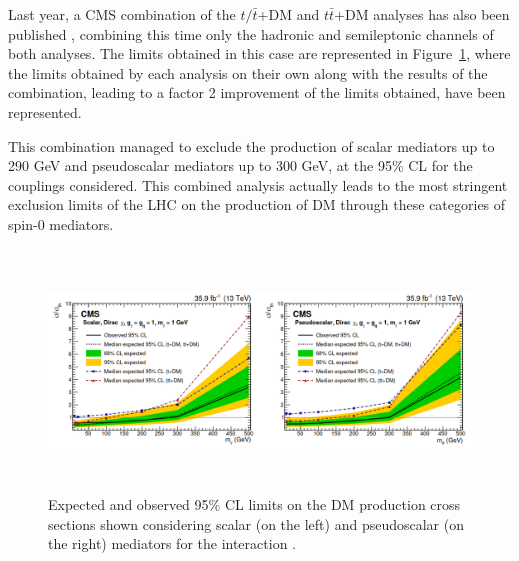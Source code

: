 \documentclass[a4paper, 10pt, openright]{report}
\begin{document}
Last year, a \ac{CMS} combination of the $t/\bar t$+DM and $t \bar t$+DM analyses has also been published \cite{PreviousSingleDoubleTopAllLep13CMS}, combining this time only the hadronic and semileptonic channels of both analyses. The limits obtained in this case are represented in Figure~\ref{figure:Combination2019}, where the limits obtained by each analysis on their own along with the results of the combination, leading to a factor 2 improvement of the limits obtained, have been represented. 

This combination managed to exclude the production of scalar mediators up to 290 GeV and pseudoscalar mediators up to 300 GeV, at the 95\% \ac{CL} for the couplings considered. This combined analysis actually leads to the most stringent exclusion limits of the \ac{LHC} on the production of \ac{DM} through these categories of spin-0 mediators.

\begin{figure}[htbp]
\begin{center}
\includegraphics[width=15.5cm, height=6.4cm]{figs/Combination2019.png}
\caption{Expected and observed 95\% \ac{CL} limits on the \ac{DM} production cross sections shown considering scalar (on the left) and pseudoscalar (on the right) mediators for the interaction \cite{PreviousSingleDoubleTopAllLep13CMS}.}
\label{figure:Combination2019}
\end{center}
\end{figure}
\end{document}
